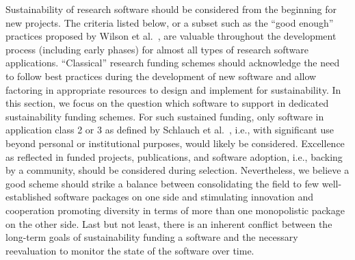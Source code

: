 \documentclass[a4paper,num-refs,numbers,sort&compress]{de-rse}
\begin{document}
Sustainability of research software should be considered from the beginning for new projects. The criteria listed below, or a subset such as the ``good enough'' practices proposed by Wilson et al.~\cite{Wilson2017}, are valuable throughout the development process (including early phases) for almost all types of research software applications. ``Classical'' research funding schemes should acknowledge the need to follow best practices during the development of new software and allow factoring in appropriate resources to design and implement for sustainability. In this section, we focus on the question which software to support in dedicated sustainability funding schemes. For such sustained funding, only software in application class 2 or 3 as defined by Schlauch et al.~\cite{https://doi.org/10.5281/zenodo.1344612}, i.e., with significant use beyond personal or institutional purposes, would likely be considered.
Excellence as reflected in funded projects, publications, and software adoption, i.e., backing by a community, should be considered during selection. Nevertheless, we believe a good scheme should strike a balance between consolidating the field to few well-established software packages on one side and stimulating innovation and cooperation promoting diversity in terms of more than one monopolistic package on the other side.
Last but not least, there is an inherent conflict between the long-term goals of sustainability funding a software and the necessary reevaluation to monitor the state of the software over time.
\end{document}
